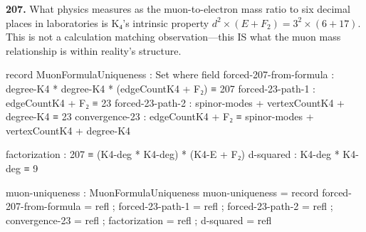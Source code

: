 \documentclass[11pt,a4paper]{book}
\begin{document}
\noindent\textbf{207.} What physics measures as the muon-to-electron mass ratio to six decimal places in laboratories is K₄'s intrinsic property $d^2 \times (E + F_2) = 3^2 \times (6 + 17)$. This is not a calculation matching observation—this IS what the muon mass relationship is within reality's structure.

\begin{code}
record MuonFormulaUniqueness : Set where
  field
    forced-207-from-formula : degree-K4 * degree-K4 * (edgeCountK4 + F₂) ≡ 207
    forced-23-path-1        : edgeCountK4 + F₂ ≡ 23
    forced-23-path-2        : spinor-modes + vertexCountK4 + degree-K4 ≡ 23
    convergence-23          : edgeCountK4 + F₂ ≡ spinor-modes + vertexCountK4 + degree-K4
    
    factorization : 207 ≡ (K4-deg * K4-deg) * (K4-E + F₂)
    d-squared : K4-deg * K4-deg ≡ 9

muon-uniqueness : MuonFormulaUniqueness
muon-uniqueness = record
  { forced-207-from-formula = refl
  ; forced-23-path-1 = refl
  ; forced-23-path-2 = refl
  ; convergence-23 = refl
  ; factorization = refl
  ; d-squared = refl
  }
\end{code}
\end{document}
